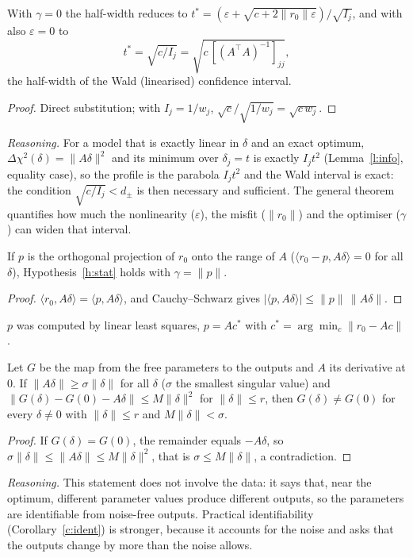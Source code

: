 \begin{sproposition}\label{p:wald}
With $\gamma=0$ the half-width reduces to $t^{\ast}=(\varepsilon+\sqrt{c+2\|r_0\|\varepsilon})/\sqrt{I_j}$, and with also $\varepsilon=0$ to
\[ t^{\ast}=\sqrt{c/I_j}=\sqrt{c\,[(A^{\top}A)^{-1}]_{jj}} , \]
the half-width of the Wald (linearised) confidence interval.
\end{sproposition}
\begin{proof}
Direct substitution; with $I_j=1/w_j$, $\sqrt{c}/\sqrt{1/w_j}=\sqrt{c\,w_j}$.
\end{proof}
\emph{Reasoning.} For a model that is exactly linear in $\delta$ and an exact optimum, $\Delta\chi^2(\delta)=\|A\delta\|^2$ and its minimum over $\delta_j=t$ is exactly $I_jt^2$ (Lemma~\ref{l:info}, equality case), so the profile is the parabola $I_jt^2$ and the Wald interval is exact: the condition $\sqrt{c/I_j}<d_\pm$ is then necessary and sufficient. The general theorem quantifies how much the nonlinearity ($\varepsilon$), the misfit ($\|r_0\|$) and the optimiser ($\gamma$) can widen that interval.

\begin{sproposition}\label{p:proj}
If $p$ is the orthogonal projection of $r_0$ onto the range of $A$ ($\langle r_0-p,A\delta\rangle=0$ for all $\delta$), Hypothesis~\ref{h:stat} holds with $\gamma=\|p\|$.
\end{sproposition}
\begin{proof}
$\langle r_0,A\delta\rangle=\langle p,A\delta\rangle$, and Cauchy--Schwarz gives $|\langle p,A\delta\rangle|\le\|p\|\,\|A\delta\|$.
\end{proof}
$p$ was computed by linear least squares, $p=Ac^{\ast}$ with $c^{\ast}=\arg\min_c\|r_0-Ac\|$.

\begin{sproposition}\label{p:local}
Let $G$ be the map from the free parameters to the outputs and $A$ its derivative at $0$. If $\|A\delta\|\ge\sigma\|\delta\|$ for all $\delta$ ($\sigma$ the smallest singular value) and $\|G(\delta)-G(0)-A\delta\|\le M\|\delta\|^2$ for $\|\delta\|\le r$, then $G(\delta)\ne G(0)$ for every $\delta\ne0$ with $\|\delta\|\le r$ and $M\|\delta\|<\sigma$.
\end{sproposition}
\begin{proof}
If $G(\delta)=G(0)$, the remainder equals $-A\delta$, so $\sigma\|\delta\|\le\|A\delta\|\le M\|\delta\|^2$, that is $\sigma\le M\|\delta\|$, a contradiction.
\end{proof}
\emph{Reasoning.} This statement does not involve the data: it says that, near the optimum, different parameter values produce different outputs, so the parameters are identifiable from noise-free outputs. Practical identifiability (Corollary~\ref{c:ident}) is stronger, because it accounts for the noise and asks that the outputs change by more than the noise allows.

